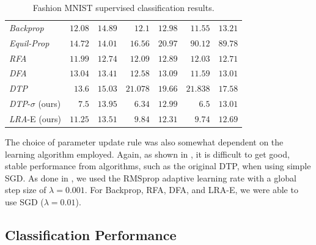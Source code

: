 \documentclass[letterpaper]{article} %
\begin{document}
\begin{table}[!t]
\begin{tabular}{l|r|r||r|r||r|r}
\hline
\textit{Backprop} & $12.08$ & $14.89$ & $12.1$ & $12.98$ & $11.55$ & $13.21$\tabularnewline
\textit{Equil-Prop} & $14.72$ & $14.01$ & $16.56$ & $20.97$ & $90.12$ & $89.78$\tabularnewline
\textit{RFA} & $11.99$ & $12.74$ & $12.09$ & $12.89$ & $12.03$ & $12.71$\tabularnewline
\textit{DFA} & $13.04$ & $13.41$ & $12.58$ & $13.09$ & $11.59$ & $13.01$\tabularnewline
\textit{DTP} & $13.6$ & $15.03$ & $21.078$ & $19.66$ & $21.838$ & $17.58$\tabularnewline
\textit{DTP}-$\sigma$ (ours) & $7.5$ & $13.95$ & $6.34$ & $12.99$ & $6.5$ & $13.01$\tabularnewline
\textit{LRA}-E (ours) & $11.25$ & $13.51$ & $9.84$ & $12.31$ & $9.74$ & $12.69$ \tabularnewline
\hline
\end{tabular}
\caption{Fashion MNIST supervised classification results.}
\label{fmnist_results}
\end{table}

The choice of parameter update rule was also somewhat dependent on the learning algorithm employed. Again, as shown in \cite{ororbia2018conducting}, it is difficult to get good, stable performance from algorithms, such as the original DTP, when using simple SGD. As done in \cite{lee2015targetprop}, we used the RMSprop \cite{tieleman2012rmsprop} adaptive learning rate with a global step size of $\lambda = 0.001$. For Backprop, RFA, DFA, and LRA-E, we were able to use SGD ($\lambda = 0.01$).

\subsection{Classification Performance}
\label{sec:supervised}
\end{document}
